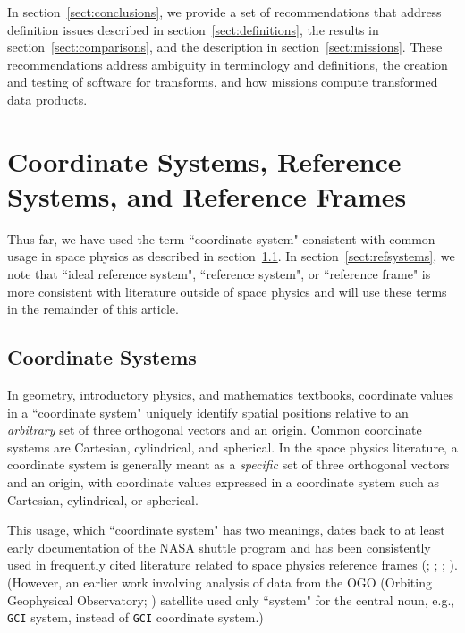 \documentclass[draft]{agujournal2019}
\begin{document}
In section~\ref{sect:conclusions}, we provide a set of recommendations that address definition issues described in section~\ref{sect:definitions}, the results in section~\ref{sect:comparisons}, and the description in section~\ref{sect:missions}. These recommendations address ambiguity in terminology and definitions, the creation and testing of software for transforms, and how missions compute transformed data products.

\section{Coordinate Systems, Reference Systems, and Reference Frames}
\label{sect:terminology}

Thus far, we have used the term ``coordinate system" consistent with common usage in space physics as described in section~\ref{sect:coordsystems}. In section~\ref{sect:refsystems}, we note that ``ideal reference system", ``reference system", or ``reference frame" is more consistent with literature outside of space physics and will use these terms in the remainder of this article.

\subsection{Coordinate Systems}
\label{sect:coordsystems}

In geometry, introductory physics, and mathematics textbooks, coordinate values in a ``coordinate system" uniquely identify spatial positions relative to an {\it arbitrary} set of three orthogonal vectors and an origin. Common coordinate systems are Cartesian, cylindrical, and spherical. In the space physics literature, a coordinate system is generally meant as a {\it specific} set of three orthogonal vectors and an origin, with coordinate values expressed in a coordinate system such as Cartesian, cylindrical, or spherical.

This usage, which ``coordinate system" has two meanings, dates back to at least early documentation of the NASA shuttle program \cite{Davis1974} and has been consistently used in frequently cited literature related to space physics reference frames (; ; ; ). (However, an earlier work involving analysis of data from the OGO (Orbiting Geophysical Observatory; ) satellite used only ``system" for the central noun, e.g., \texttt{GCI} system, instead of \texttt{GCI} coordinate system.)
\end{document}
